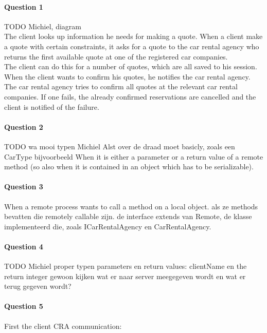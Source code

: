 \documentclass{ds-report}
\begin{document}
	\maketitle

	\paragraph{Question 1} 
	TODO Michiel, diagram 
	\\
	The client looks up information he needs for making a quote. When a client make a quote with certain constraints, it asks for a quote to the car rental agency who returns the first available quote at one of the registered car companies. \\
	The client can do this for a number of quotes, which are all saved to his session. When the client wants to confirm his quotes, he notifies the car rental agency. The car rental agency tries to confirm all quotes at the relevant car rental companies. If one fails, the already confirmed reservations are cancelled and the client is notified of the failure.
	
	
	\paragraph{Question 2} TODO wa mooi typen Michiel
	Alst over de draad moet basicly, zoals een CarType bijvoorbeeld
	When it is either a parameter or a return value of a remote method (so also when it is contained in an object which has to be serializable).

	
	\paragraph{Question 3} 
	When a remote process wants to call a method on a local object. 
	als ze methods bevatten die remotely callable zijn. de interface extends van Remote, de klasse implementeerd die, zoals ICarRentalAgency en CarRentalAgency.
	
	\paragraph{Question 4} TODO Michiel proper typen
	parameters en return values: clientName en the return integer
	gewoon kijken wat er naar server meegegeven wordt en wat er terug gegeven wordt?
	
	\paragraph{Question 5} 
	First the client CRA communication:\\
\end{document}
